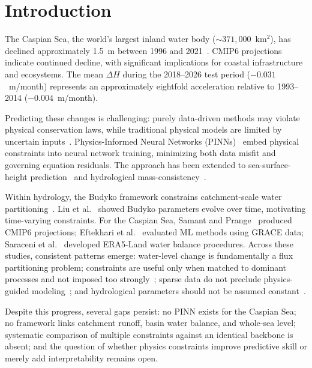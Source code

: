\documentclass[conference,a4paper]{IEEEtran}
\begin{document}
\section{Introduction}

The Caspian Sea, the world's largest inland water body (${\sim}371{,}000$~km$^2$), has declined approximately 1.5~m between 1996 and 2021~\cite{samant2023climate}. CMIP6 projections indicate continued decline, with significant implications for coastal infrastructure and ecosystems. The mean $\Delta H$ during the 2018--2026 test period ($-0.031$~m/month) represents an approximately eightfold acceleration relative to 1993--2014 ($-0.004$~m/month).

Predicting these changes is challenging: purely data-driven methods may violate physical conservation laws, while traditional physical models are limited by uncertain inputs~\cite{saraceni2025water}. Physics-Informed Neural Networks (PINNs)~\cite{raissi2019physics} embed physical constraints into neural network training, minimizing both data misfit and governing equation residuals. The approach has been extended to sea-surface-height prediction~\cite{huang2025physics} and hydrological mass-consistency~\cite{bhasme2021physics}.

Within hydrology, the Budyko framework constrains catchment-scale water partitioning~\cite{cheng2025global}. Liu et al.~\cite{liu2025timevarying} showed Budyko parameters evolve over time, motivating time-varying constraints. For the Caspian Sea, Samant and Prange~\cite{samant2023climate} produced CMIP6 projections; Eftekhari et al.~\cite{eftekhari2024evaluation} evaluated ML methods using GRACE data; Saraceni et al.~\cite{saraceni2025water} developed ERA5-Land water balance procedures. Across these studies, consistent patterns emerge: water-level change is fundamentally a flux partitioning problem; constraints are useful only when matched to dominant processes and not imposed too strongly~\cite{huang2025physics,cuomo2022pinn}; sparse data do not preclude physics-guided modeling~\cite{podina2023universal}; and hydrological parameters should not be assumed constant~\cite{liu2025timevarying}.

Despite this progress, several gaps persist: no PINN exists for the Caspian Sea; no framework links catchment runoff, basin water balance, and whole-sea level; systematic comparison of multiple constraints against an identical backbone is absent; and the question of whether physics constraints improve predictive skill or merely add interpretability remains open.
\end{document}
